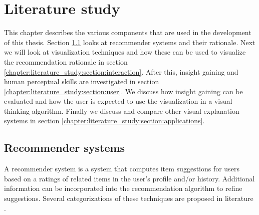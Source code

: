 \chapter{Literature study}\label{chapter:literature_study}


This chapter describes the various components that are used in the development of this thesis. Section \ref{chapter:literature_study:section:computer} looks at recommender systems and their rationale. Next we will look at visualization techniques and how these can be used to visualize the recommendation rationale in section \ref{chapter:literature_study:section:interaction}. After this, insight gaining and human perceptual skills are investigated in section \ref{chapter:literature_study:section:user}. We discuss how insight gaining can be evaluated and how the user is expected to use the visualization in a visual thinking algorithm. Finally we discuss and compare other visual explanation systems in section \ref{chapter:literature_study:section:applications}.




% 
\section{Recommender systems}\label{chapter:literature_study:section:computer}

A recommender system is a system that computes item suggestions for users based on a ratings of related items in the user's profile and/or history. Additional information can be incorporated into the recommendation algorithm to refine suggestions. Several categorizations of these techniques are proposed in literature \cite{bostandjiev:2012, burke:2002, herlocker:2000, melville:2002:CCF:777092.777124, celma:2008:phd}.

